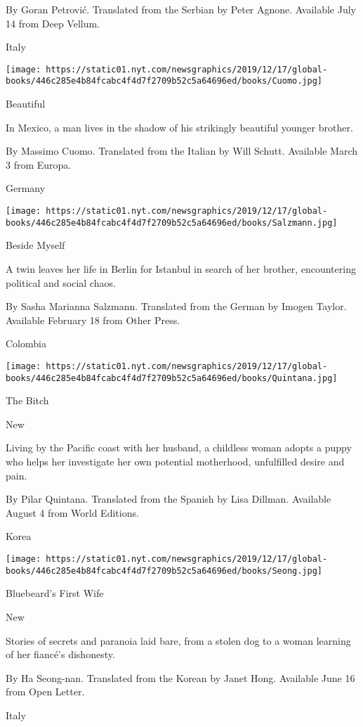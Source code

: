  By Goran Petrović. Translated from the Serbian by Peter Agnone.
Available July 14 from Deep Vellum.

Italy

\texttt{[image: https://static01.nyt.com/newsgraphics/2019/12/17/global-books/446c285e4b84fcabc4f4d7f2709b52c5a64696ed/books/Cuomo.jpg]}

Beautiful

In Mexico, a man lives in the shadow of his strikingly beautiful younger
brother.

 By Massimo Cuomo. Translated from the Italian by Will Schutt. Available
March 3 from Europa.

Germany

\texttt{[image: https://static01.nyt.com/newsgraphics/2019/12/17/global-books/446c285e4b84fcabc4f4d7f2709b52c5a64696ed/books/Salzmann.jpg]}

Beside Myself

A twin leaves her life in Berlin for Istanbul in search of her brother,
encountering political and social chaos.

 By Sasha Marianna Salzmann. Translated from the German by Imogen
Taylor. Available February 18 from Other Press.

Colombia

\texttt{[image: https://static01.nyt.com/newsgraphics/2019/12/17/global-books/446c285e4b84fcabc4f4d7f2709b52c5a64696ed/books/Quintana.jpg]}

The Bitch

New

Living by the Pacific coast with her husband, a childless woman adopts a
puppy who helps her investigate her own potential motherhood,
unfulfilled desire and pain.

 By Pilar Quintana. Translated from the Spanish by Lisa Dillman.
Available August 4 from World Editions.

Korea

\texttt{[image: https://static01.nyt.com/newsgraphics/2019/12/17/global-books/446c285e4b84fcabc4f4d7f2709b52c5a64696ed/books/Seong.jpg]}

Bluebeard's First Wife

New

Stories of secrets and paranoia laid bare, from a stolen dog to a woman
learning of her fiancé's dishonesty.

 By Ha Seong-nan. Translated from the Korean by Janet Hong. Available
June 16 from Open Letter.

Italy

